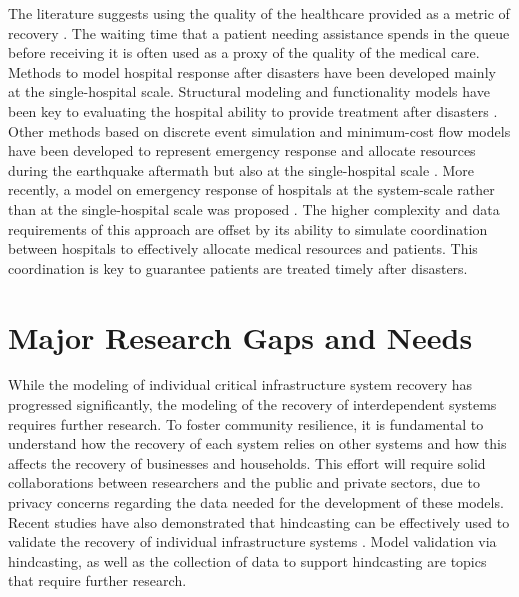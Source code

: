 The literature suggests using the quality of the healthcare provided as a metric of recovery \citep{vieth2006effect, hamby2004using}. The waiting time that a patient needing assistance spends in the queue before receiving it is often used as a proxy of the quality of the medical care. Methods to model hospital response after disasters have been developed mainly at the single-hospital scale. Structural modeling and functionality models have been key to evaluating the hospital ability to provide treatment after disasters \citep{cimellaro2011performance,jacques2014resilience,yavari2010modeling}. Other methods based on discrete event simulation and minimum-cost flow models have been developed to represent emergency response and allocate resources during the earthquake aftermath but also at the single-hospital scale \citep{aghapour2019capacity,gul2015comprehensive,vugrin2015modeling,yi2005real}. More recently, a model on emergency response of hospitals at the system-scale rather than at the single-hospital scale was proposed \citep{ceferino2019effective}. The higher complexity and data requirements of this approach are offset by its ability to simulate coordination between hospitals to effectively allocate medical resources and patients. This coordination is key to guarantee patients are treated timely after disasters.\

\section{Major Research Gaps and Needs}
While the modeling of individual critical infrastructure system recovery has progressed significantly, the modeling of the recovery of interdependent systems requires further research. To foster community resilience, it is fundamental to understand how the recovery of each system relies on other systems and how this affects the recovery of businesses and households. This effort will require solid collaborations between researchers and the public and private sectors, due to privacy concerns regarding the data needed for the development of these models. Recent studies have also demonstrated that hindcasting can be effectively used to validate the recovery of individual infrastructure systems \citep{tomar2020hindcasting}. Model validation via hindcasting, as well as the collection of data to support hindcasting are topics that require further research. \

\FloatBarrier